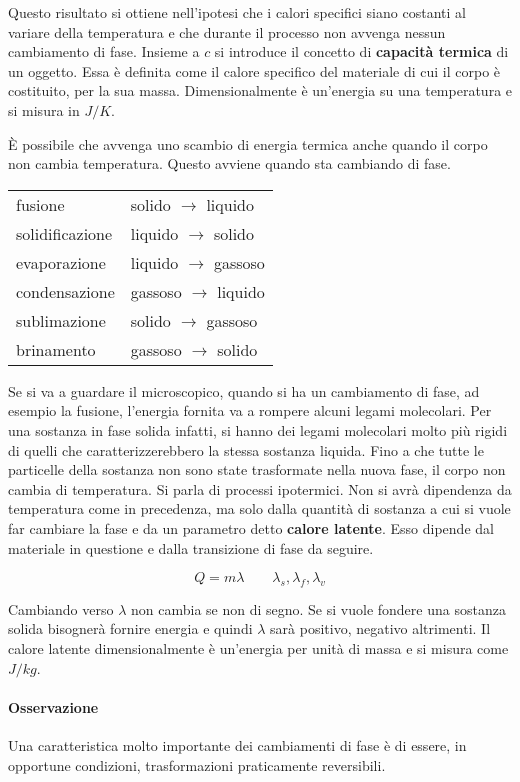 Questo risultato si ottiene nell'ipotesi che i calori specifici siano costanti al variare della temperatura e che durante il processo non avvenga nessun cambiamento di fase.
Insieme a $c$ si introduce il concetto di \textbf{capacità termica} di un oggetto. Essa è definita come il calore specifico del materiale di cui il corpo è costituito, per la sua massa. Dimensionalmente è un'energia su una temperatura e si misura in $J/K$.

È possibile che avvenga uno scambio di energia termica anche quando il corpo non cambia temperatura. Questo avviene quando sta cambiando di fase.

\begin{table}[htpb]
	\centering
	\begin{tabular}{ll}
		fusione & solido $\to$ liquido \\
		solidificazione & liquido $\to$ solido \\
		evaporazione & liquido $\to$ gassoso \\
		condensazione & gassoso $\to$ liquido \\
		sublimazione & solido $\to$ gassoso \\
		brinamento & gassoso $\to$ solido \\
	\end{tabular}
\end{table}

Se si va a guardare il microscopico, quando si ha un cambiamento di fase, ad esempio la fusione, l'energia fornita va a rompere alcuni legami molecolari. Per una sostanza in fase solida infatti, si hanno dei legami molecolari molto più rigidi di quelli che caratterizzerebbero la stessa sostanza liquida. Fino a che tutte le particelle della sostanza non sono state trasformate nella nuova fase, il corpo non cambia di temperatura. Si parla di processi ipotermici.
Non si avrà dipendenza da temperatura come in precedenza, ma solo dalla quantità di sostanza a cui si vuole far cambiare la fase e da un parametro detto \textbf{calore latente}. Esso dipende dal materiale in questione e dalla transizione di fase da seguire.

\[
	Q = m \lambda \qquad \lambda_s,\lambda_f,\lambda_v
\]

Cambiando verso $\lambda$ non cambia se non di segno. Se si vuole fondere una sostanza solida bisognerà fornire energia e quindi $\lambda$ sarà positivo, negativo altrimenti. Il calore latente dimensionalmente è un'energia per unità di massa e si misura come $J/kg$.

\paragraph{Osservazione} Una caratteristica molto importante dei cambiamenti di fase è di essere, in opportune condizioni, trasformazioni praticamente reversibili.

